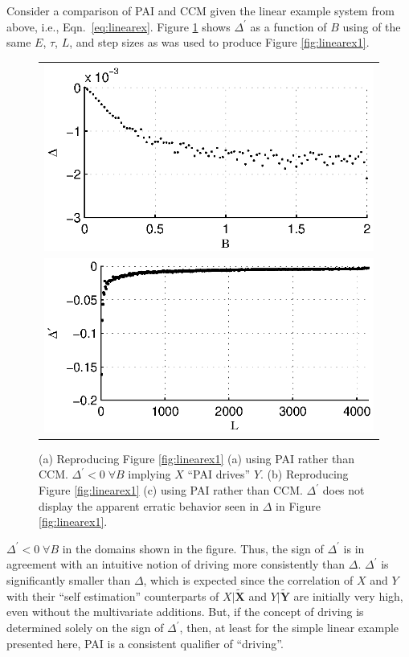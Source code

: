 \documentclass[twocolumn,aps,pre,groupedaddress]{revtex4-1}
\begin{document}
Consider a comparison of PAI and CCM given the linear example system from above, i.e., Eqn.\ \ref{eq:linearex}.  Figure \ref{fig:linearExPAI} shows $\Delta^\prime$ as a function of $B$ using of the same $E$, $\tau$, $L$, and step sizes as was used to produce Figure \ref{fig:linearex1}.
\begin{figure}[ht]
\begin{tabular}{c}
\includegraphics[scale=0.8]{LinearExPAI.eps} \\
\includegraphics[scale=0.8]{LinearExPAIChangeL.eps} \\
\end{tabular}
\caption{(a) Reproducing Figure \ref{fig:linearex1} (a) using PAI rather than CCM.  $\Delta^\prime<0\;\forall B$ implying $X$ ``PAI drives'' $Y$. (b) Reproducing Figure \ref{fig:linearex1} (c) using PAI rather than CCM.  $\Delta^\prime$ does not display the apparent erratic behavior seen in $\Delta$ in Figure \ref{fig:linearex1}.}
\label{fig:linearExPAI}
\end{figure}
$\Delta^\prime<0\;\forall B$ in the domains shown in the figure.  Thus, the sign of $\Delta^\prime$ is in agreement with an intuitive notion of driving more consistently than $\Delta$.  $\Delta^\prime$ is significantly smaller than $\Delta$, which is expected since the correlation of $X$ and $Y$ with their ``self estimation'' counterparts of $X|\tilde{\mathbf{X}}$ and $Y|\tilde{\mathbf{Y}}$ are initially very high, even without the multivariate additions.  But, if the concept of driving is determined solely on the sign of $\Delta^\prime$, then, at least for the simple linear example presented here, PAI is a consistent qualifier of ``driving''.
\end{document}
